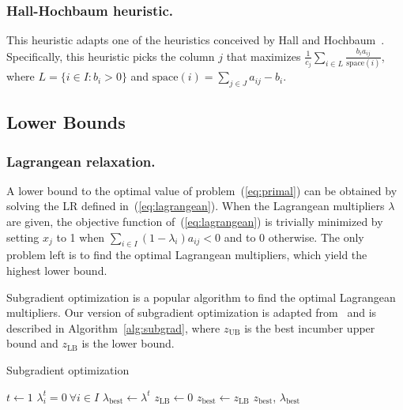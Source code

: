 \documentclass[runningheads]{llncs}
\begin{document}
\subsubsection{Hall-Hochbaum heuristic.} This heuristic adapts one of the heuristics conceived by Hall and Hochbaum~\cite{hall-hochbaum-1992-multicovering}. Specifically, this heuristic picks the column $j$ that maximizes $\frac{1}{c_j} \sum_{i \in L} \frac{b_i a_{ij}}{\text{space}(i)}$, where $L = \{i \in I : b_i > 0 \}$ and $\text{space}(i) = \sum_{j \in J} a_{ij} - b_i$.

\subsection{Lower Bounds}
\label{subsec:branch-bound:lb}

\subsubsection{Lagrangean relaxation.} A lower bound to the optimal value of problem~(\ref{eq:primal}) can be obtained by solving the LR defined in~(\ref{eq:lagrangean}). When the Lagrangean multipliers $\lambda$ are given, the objective function of~(\ref{eq:lagrangean}) is trivially minimized by setting $x_j$ to 1 when $\sum_{i \in I} (1 - \lambda_i) a_{ij} < 0$ and to 0 otherwise. The only problem left is to find the optimal Lagrangean multipliers, which yield the highest lower bound.

Subgradient optimization is a popular algorithm to find the optimal Lagrangean multipliers. Our version of subgradient optimization is adapted from~\cite{balas-carrera-1996-dynamic} and is described in Algorithm~\ref{alg:subgrad}, where $z_{\text{UB}}$ is the best incumber upper bound and $z_{\text{LB}}$ is the lower bound.

\begin{algorithm}
  \DontPrintSemicolon
  \caption{Subgradient optimization}\label{alg:subgrad}
  $t \gets 1$\; 
  $\lambda_i^t = 0 ~ \forall i \in I$\;
  $\lambda_{\text{best}} \gets \lambda^t$\;
  $z_{\text{LB}} \gets 0$\; 
  $z_{\text{best}} \gets z_{\text{LB}}$\; 
  \Return $z_{\text{best}}$, $\lambda_{\text{best}}$
\end{algorithm}
\end{document}
